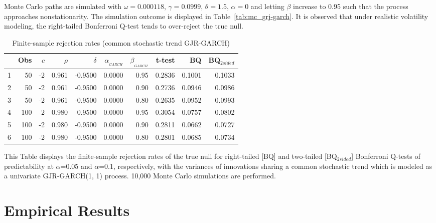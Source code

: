 \documentclass{article}
\begin{document}
Monte Carlo paths are simulated with $\omega = 0.000118$, $\gamma=0.0999$, $\theta=1.5$, $\alpha=0$ and letting $\beta$ increase to 0.95 such that the process approaches nonstationarity. The simulation outcome is displayed in Table~\vref{tab:mc_grj-garch}. It is observed that under realistic volatility modeling, the right-tailed Bonferroni Q-test tends to over-reject the true null.

\begin{table}[hbt]
\centering
\caption{Finite-sample rejection rates (common stochastic trend GJR-GARCH)}
\label{tab:mc_grj-garch}
\begin{threeparttable}
\begin{tabular}{rrrrrrrrrr}
  \hline
  & Obs & $c$ & $\rho$ & $\delta$ & $\alpha_{_{GARCH}}$ & $\beta_{_{GARCH}}$ & t-test &BQ& BQ$_{{2sided}}$ \\ 
  \hline
1 & 50 & -2 & 0.961 & -0.9500 & 0.0000 & 0.95 & 0.2836 & 0.1001 & 0.1033 \\ 
  2 & 50 & -2 & 0.961 & -0.9500 & 0.0000 & 0.90 & 0.2736 & 0.0946 & 0.0986 \\ 
  3 & 50 & -2 & 0.961 & -0.9500 & 0.0000 & 0.80 & 0.2635 & 0.0952 & 0.0993 \\ 
  4 & 100 & -2 & 0.980 & -0.9500 & 0.0000 & 0.95 & 0.3054 & 0.0757 & 0.0802 \\ 
  5 & 100 & -2 & 0.980 & -0.9500 & 0.0000 & 0.90 & 0.2811 & 0.0662 & 0.0727 \\ 
  6 & 100 & -2 & 0.980 & -0.9500 & 0.0000 & 0.80 & 0.2801 & 0.0685 & 0.0734 \\ 
   \hline
\end{tabular}
 \begin{tablenotes}
 \small
\item This Table displays the finite-sample rejection rates of the true null for right-tailed [BQ] and two-tailed  [BQ$_{{2sided}}$] Bonferroni Q-tests of predictability at $\alpha$=0.05 and $\alpha$=0.1, respectively, with the variances of innovations sharing a common stochastic trend which is modeled as a univariate GJR-GARCH(1, 1) process. 10,000 Monte Carlo simulations are performed.
\end{tablenotes}
\end{threeparttable}
\end{table}


\section{Empirical Results}
\end{document}
